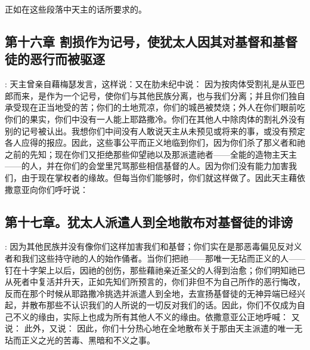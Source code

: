 正如在这些段落中天主的话所要求的。\par


\subsection{第十六章 割损作为记号，使犹太人因其对基督和基督徒的恶行而被驱逐}

: 天主曾亲自藉梅瑟发言，这样说：又在肋未纪中说： 因为按肉体受割礼是从亚巴郎而来，是作为一个记号，使你们与其他民族分离，也与我们分离；并且你们独自承受现在正当地受的苦；你们的土地荒凉，你们的城邑被焚烧；外人在你们眼前吃你们的果实，你们中没有一人能上耶路撒冷。你们在其他人中除肉体的割礼外没有别的记号被认出。我想你们中间没有人敢说天主从未预见或将来的事，或没有预定各人应得的报应。因此，这些事公平而正义地临到你们，因为你们杀了那义者和祂之前的先知；现在你们又拒绝那些仰望祂以及那派遣祂者——全能的造物主天主——的人，并在你们的会堂里咒骂那些相信基督的人。因为你们没有能力加害我们，由于现在掌权者的缘故。但每当你们能够时，你们就这样做了。因此天主藉依撒意亚向你们呼吁说：\par


\subsection{第十七章。犹太人派遣人到全地散布对基督徒的诽谤}

: 因为其他民族并没有像你们这样加害我们和基督；你们实在是那恶毒偏见反对义者和我们这些持守祂的人的始作俑者。当你们把祂——那唯一无玷而正义的人——钉在十字架上以后，因祂的创伤，那些藉祂亲近圣父的人得到治愈；你们明知祂已从死者中复活并升天，正如先知们所预言的，你们非但不为自己所作的恶行悔改，反而在那个时候从耶路撒冷挑选并派遣人到全地，去宣扬基督徒的无神异端已经兴起，并散布那些不认识我们的人所说的一切反对我们的话。因此，你们不仅成为自己不义的缘由，实际上也成为所有其他人不义的缘由。依撒意亚公正地呼喊： 又说： 此外，又说： 因此，你们十分热心地在全地散布关于那由天主派遣的唯一无玷而正义之光的苦毒、黑暗和不义之事。\par

